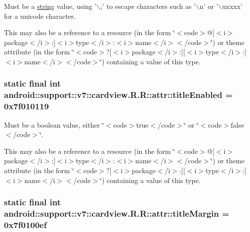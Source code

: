 Must be a \hyperlink{classandroid_1_1support_1_1v7_1_1cardview_1_1_r_1_1string}{string} value, using '$\backslash$;' to escape characters such as '$\backslash$n' or '$\backslash$uxxxx' for a unicode character. 

This may also be a reference to a resource (in the form \char`\"{}$<$code$>$@\mbox{[}$<$i$>$package$<$/i$>$:\mbox{]}$<$i$>$type$<$/i$>$:$<$i$>$name$<$/i$>$$<$/code$>$\char`\"{}) or theme attribute (in the form \char`\"{}$<$code$>$?\mbox{[}$<$i$>$package$<$/i$>$:\mbox{]}\mbox{[}$<$i$>$type$<$/i$>$:\mbox{]}$<$i$>$name$<$/i$>$$<$/code$>$\char`\"{}) containing a value of this type. \hypertarget{classandroid_1_1support_1_1v7_1_1cardview_1_1_r_1_1attr_cb4fb938012c76e07c928ff96d806b9c}{
\subsubsection[{titleEnabled}]{\setlength{\rightskip}{0pt plus 5cm}static final int android::support::v7::cardview.R.R::attr::titleEnabled = 0x7f010119}}
\label{classandroid_1_1support_1_1v7_1_1cardview_1_1_r_1_1attr_cb4fb938012c76e07c928ff96d806b9c}


Must be a boolean value, either \char`\"{}$<$code$>$true$<$/code$>$\char`\"{} or \char`\"{}$<$code$>$false$<$/code$>$\char`\"{}. 

This may also be a reference to a resource (in the form \char`\"{}$<$code$>$@\mbox{[}$<$i$>$package$<$/i$>$:\mbox{]}$<$i$>$type$<$/i$>$:$<$i$>$name$<$/i$>$$<$/code$>$\char`\"{}) or theme attribute (in the form \char`\"{}$<$code$>$?\mbox{[}$<$i$>$package$<$/i$>$:\mbox{]}\mbox{[}$<$i$>$type$<$/i$>$:\mbox{]}$<$i$>$name$<$/i$>$$<$/code$>$\char`\"{}) containing a value of this type. \hypertarget{classandroid_1_1support_1_1v7_1_1cardview_1_1_r_1_1attr_c7d619d9cac8afca52dd5162eb0c155f}{
\subsubsection[{titleMargin}]{\setlength{\rightskip}{0pt plus 5cm}static final int android::support::v7::cardview.R.R::attr::titleMargin = 0x7f0100ef}}
\label{classandroid_1_1support_1_1v7_1_1cardview_1_1_r_1_1attr_c7d619d9cac8afca52dd5162eb0c155f}


